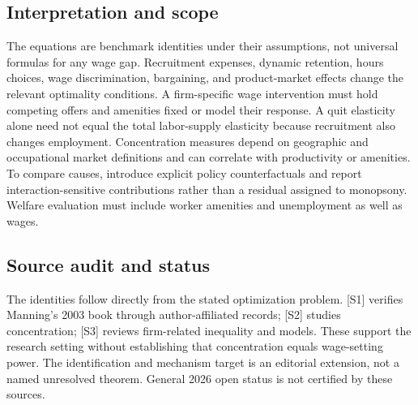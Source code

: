 \documentclass[11pt,a4paper]{article}
\begin{document}
\subsection*{Interpretation and scope}
The equations are benchmark identities under their assumptions, not universal formulas for any wage gap. Recruitment expenses, dynamic retention, hours choices, wage discrimination, bargaining, and product-market effects change the relevant optimality conditions. A firm-specific wage intervention must hold competing offers and amenities fixed or model their response. A quit elasticity alone need not equal the total labor-supply elasticity because recruitment also changes employment. Concentration measures depend on geographic and occupational market definitions and can correlate with productivity or amenities. To compare causes, introduce explicit policy counterfactuals and report interaction-sensitive contributions rather than a residual assigned to monopsony. Welfare evaluation must include worker amenities and unemployment as well as wages.
\subsection*{Source audit and status}
The identities follow directly from the stated optimization problem. [S1] verifies Manning's 2003 book through author-affiliated records; [S2] studies concentration; [S3] reviews firm-related inequality and models. These support the research setting without establishing that concentration equals wage-setting power. The identification and mechanism target is an editorial extension, not a named unresolved theorem. General 2026 open status is not certified by these sources.
\end{document}

